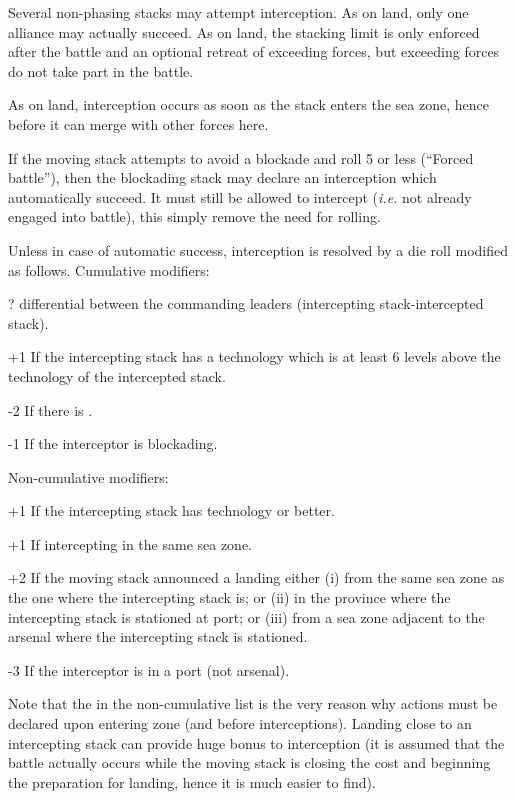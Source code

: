 Several non-phasing stacks may attempt interception. As on land, only one
alliance may actually succeed. As on land, the stacking limit is only enforced
after the battle and an optional retreat of exceeding forces, but exceeding
forces do not take part in the battle.

As on land, interception occurs as soon as the stack enters the sea zone,
hence before it can merge with other forces here.

If the moving stack attempts to avoid a blockade and roll 5 or less (``Forced
battle''), then the blockading stack may declare an interception which
automatically succeed. It must still be allowed to intercept (\emph{i.e.} not
already engaged into battle), this simply remove the need for rolling.

Unless in case of automatic success, interception is resolved by a die roll
modified as follows. Cumulative modifiers:
\begin{modlist}
\item[\textplusminus?] \Man differential between the commanding leaders
  (intercepting stack-intercepted stack).
\item[+1] If the intercepting stack has a technology which is at least 6
  levels above the technology of the intercepted stack.
\item[-2] If there is .
\item[-1] If the interceptor is blockading.
\end{modlist}
Non-cumulative modifiers:
\begin{modlist}
\item[+1] If the intercepting stack has technology \TTD or better.
\item[+1] If intercepting in the same sea zone.
\item[+2] If the moving stack announced a landing either (i) from the same sea
  zone as the one where the intercepting stack is; or (ii) in the province
  where the intercepting stack is stationed at port; or (iii) from a sea zone
  adjacent to the arsenal where the intercepting stack is stationed.
\item[-3] If the interceptor is in a port (not arsenal).
\end{modlist}

Note that the  in the non-cumulative list is the very reason why
actions must be declared upon entering zone (and before
interceptions). Landing close to an intercepting stack can provide huge bonus
to interception (it is assumed that the battle actually occurs while the
moving stack is closing the cost and beginning the preparation for landing,
hence it is much easier to find).

